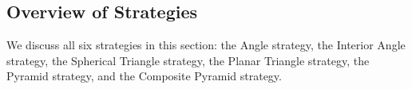 
\subsection{Overview of Strategies}\label{subsec:strat}
We discuss all six strategies in this section: the Angle strategy, the Interior Angle strategy, the Spherical Triangle strategy, the Planar Triangle strategy, the Pyramid strategy, and the Composite Pyramid strategy.

